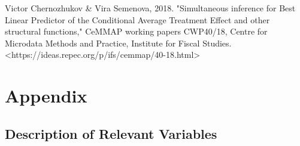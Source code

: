 \documentclass[11pt,a4paper]{article}
\begin{document}
Victor Chernozhukov & Vira Semenova, 2018. "Simultaneous inference for Best Linear Predictor of the Conditional Average Treatment Effect and other structural functions," CeMMAP working papers CWP40/18, Centre for Microdata Methods and Practice, Institute for Fiscal Studies. <https://ideas.repec.org/p/ifs/cemmap/40-18.html>

\newpage

\cleardoublepage
\appendix
\setcounter{table}{0}
\setcounter{figure}{0}
\renewcommand{\thetable}{A\arabic{table}}
\renewcommand{\thefigure}{A\arabic{figure}}


\hypertarget{appendix}{%
\section{Appendix}\label{appendix}}

\hypertarget{description-of-relevant-variables}{%
\subsection{\texorpdfstring{Description of Relevant Variables
\label{app:A}}{Description of relevant Variables }}\label{description-of-relevant-variables}}
\end{document}
